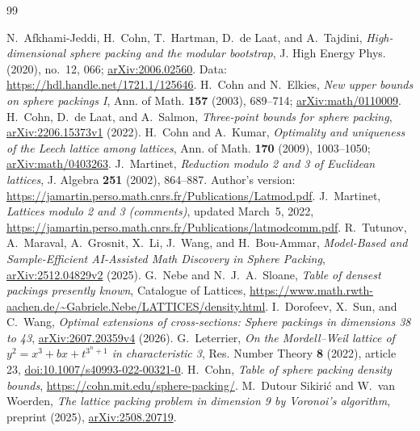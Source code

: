 \documentclass[11pt]{article}
\begin{document}
\begin{thebibliography}{99}
\raggedright
{}
N.~Afkhami-Jeddi, H.~Cohn, T.~Hartman, D.~de Laat, and A.~Tajdini,
\emph{High-dimensional sphere packing and the modular bootstrap},
J. High Energy Phys. (2020), no.~12, 066;
\href{https://arxiv.org/abs/2006.02560}{arXiv:2006.02560}.
Data: \url{https://hdl.handle.net/1721.1/125646}.
H.~Cohn and N.~Elkies, \emph{New upper bounds on sphere packings I},
Ann. of Math. \textbf{157} (2003), 689--714;
\href{https://arxiv.org/abs/math/0110009}{arXiv:math/0110009}.
H.~Cohn, D.~de Laat, and A.~Salmon, \emph{Three-point bounds for sphere packing},
\href{https://arxiv.org/abs/2206.15373v1}{arXiv:2206.15373v1} (2022).
H.~Cohn and A.~Kumar, \emph{Optimality and uniqueness of the Leech lattice
among lattices}, Ann. of Math. \textbf{170} (2009), 1003--1050;
\href{https://arxiv.org/abs/math/0403263}{arXiv:math/0403263}.
J.~Martinet, \emph{Reduction modulo 2 and 3 of Euclidean lattices},
J. Algebra \textbf{251} (2002), 864--887.
Author's version: \url{https://jamartin.perso.math.cnrs.fr/Publications/Latmod.pdf}.
J.~Martinet, \emph{Lattices modulo 2 and 3 (comments)}, updated March~5, 2022,
\url{https://jamartin.perso.math.cnrs.fr/Publications/latmodcomm.pdf}.
R.~Tutunov, A.~Maraval, A.~Grosnit, X.~Li, J.~Wang, and H.~Bou-Ammar,
\emph{Model-Based and Sample-Efficient AI-Assisted Math Discovery in Sphere Packing},
\href{https://arxiv.org/abs/2512.04829v2}{arXiv:2512.04829v2} (2025).
G.~Nebe and N.~J.~A.~Sloane, \emph{Table of densest packings presently known},
Catalogue of Lattices,
\url{https://www.math.rwth-aachen.de/~Gabriele.Nebe/LATTICES/density.html}.
I.~Dorofeev, X.~Sun, and C.~Wang,
\emph{Optimal extensions of cross-sections: Sphere packings in dimensions 38 to 43},
\href{https://arxiv.org/abs/2607.20359v4}{arXiv:2607.20359v4} (2026).
G.~Leterrier, \emph{On the Mordell--Weil lattice of
$y^2=x^3+bx+t^{3^n+1}$ in characteristic 3},
Res. Number Theory \textbf{8} (2022), article 23,
\href{https://doi.org/10.1007/s40993-022-00321-0}{doi:10.1007/s40993-022-00321-0}.
H.~Cohn, \emph{Table of sphere packing density bounds},
\url{https://cohn.mit.edu/sphere-packing/}.
M.~Dutour Sikiri\'c and W.~van Woerden,
\emph{The lattice packing problem in dimension 9 by Voronoi's algorithm},
preprint (2025),
\href{https://arxiv.org/abs/2508.20719}{arXiv:2508.20719}.
\end{thebibliography}
\end{document}
